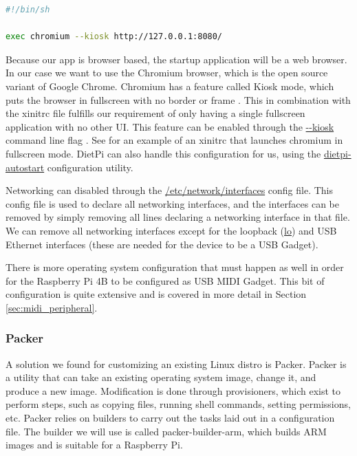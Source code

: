 \begin{lstlisting}[language=bash, label={lst:xinitrc}, caption=Example .xinitrc]
#!/bin/sh

exec chromium --kiosk http://127.0.0.1:8080/
\end{lstlisting}

Because our app is browser based, the startup application will be a web browser. In our
case we want to use the Chromium browser, which is the open source variant of Google
Chrome. Chromium has a feature called Kiosk mode, which puts the browser in fullscreen
with no border or frame \autocite{chromiumKioskMode}. This in combination with the xinitrc
file fulfills our requirement of only having a single fullscreen application with no other
UI. This feature can be enabled through the \url{--kiosk} command line flag
\autocite{chromiumKioskMode}. See  for an example of an xinitrc that
launches chromium in fullscreen mode. DietPi can also handle this configuration for us,
using the \url{dietpi-autostart} configuration utility.

Networking can disabled through the \url{/etc/network/interfaces} config file. This config
file is used to declare all networking interfaces, and the interfaces can be removed by
simply removing all lines declaring a networking interface in that file. We can remove all
networking interfaces except for the loopback (\url{lo}) and USB Ethernet interfaces
(these are needed for the device to be a USB Gadget).

There is more operating system configuration that must happen as well in order for the
Raspberry Pi 4B to be configured as USB MIDI Gadget. This bit of configuration is quite
extensive and is covered in more detail in Section \ref{sec:midi_peripheral}.

\subsubsection{Packer}
\label{sec:packer}

A solution we found for customizing an existing Linux distro is Packer. Packer is a
utility that can take an existing operating system image, change it, and produce a new
image. Modification is done through provisioners, which exist to perform steps, such as
copying files, running shell commands, setting permissions, etc. Packer relies on builders
to carry out the tasks laid out in a configuration file. The builder we will use is called
packer-builder-arm, which builds ARM images and is suitable for a Raspberry Pi.

